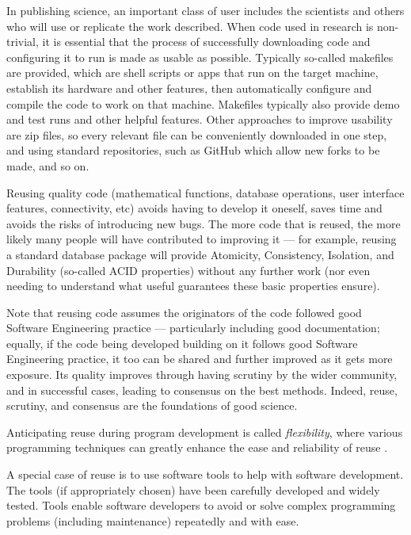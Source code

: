\documentclass[10pt,a4paper]{article}
\begin{document}
{In publishing science, an important class of user includes the scientists and others who will use or replicate the work described. When code used in research is non-trivial, it is essential that the process of successfully downloading code and configuring it to run is made as usable as possible. Typically so-called makefiles are provided, which are shell scripts or apps that run on the target machine, establish its hardware and other features, then automatically configure and compile the code to work on that machine. Makefiles typically also provide demo and test runs and other helpful features. Other approaches to improve usability are zip files, so every relevant file can be conveniently downloaded in one step, and using standard repositories, such as GitHub which allow new forks to be made, and so on.}

Reusing quality code (mathematical functions, database operations, user interface features, connectivity, etc) avoids having to develop it oneself, saves time and avoids the risks of introducing new bugs. The more code that is reused, the more likely many people will have contributed to improving it --- for example, reusing a standard database package will provide Atomicity, Consistency, Isolation, and Durability (so-called ACID properties) without any further work (nor even needing to understand what useful guarantees these basic properties ensure). 

Note that reusing code assumes the originators of the code followed good Software Engineering practice --- particularly including good documentation; equally, if the code being developed building on it follows good Software Engineering practice, it too can be shared and further improved as it gets more exposure. Its quality improves through having scrutiny by the wider community, and in successful cases, leading to consensus on the best methods. Indeed, reuse, scrutiny, and consensus are the foundations of good science.

Anticipating reuse during program development is called \emph{flexibility}, where various programming techniques can greatly enhance the ease and reliability of reuse \cite{flexibility}.

A special case of reuse is to use software tools to help with software development. The tools (if appropriately chosen) have been carefully developed and widely tested. Tools enable software developers to avoid or solve complex programming problems (including maintenance) repeatedly and with ease.
\end{document}
